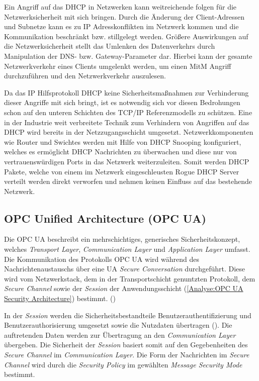 Ein Angriff auf das \ac{DHCP} in Netzwerken kann weitreichende folgen für die Netzwerksicherheit mit sich bringen. Durch die Änderung der Client-Adressen und Subnetze kann es zu \ac{IP} Adresskonflikten im Netzwerk kommen und die Kommunikation beschränkt bzw. stillgelegt werden. Größere Auswirkungen auf die Netzwerksicherheit stellt das Umlenken des Datenverkehrs durch Manipulation der \ac{DNS}- bzw. Gateway-Parameter dar. Hierbei kann der gesamte Netzwerkverkehr eines Clients umgelenkt werden, um einen \ac{MitM} Angriff durchzuführen und den Netzwerkverkehr auszulesen.

Da das \ac{IP} Hilfsprotokoll \ac{DHCP} keine Sicherheitsmaßnahmen zur Verhinderung dieser Angriffe mit sich bringt, ist es notwendig sich vor diesen Bedrohungen schon auf den unteren Schichten des \ac{TCP}/\ac{IP} Referenzmodells zu schützen. Eine in der Industrie weit verbreitete Technik zum Verhindern von Angriffen auf das \ac{DHCP} wird bereits in der Netzzugangsschicht umgesetzt. Netzwerkkomponenten wie Router und Swichtes werden mit Hilfe von \ac{DHCP} Snooping konfiguriert, welches es ermöglicht \ac{DHCP} Nachrichten zu überwachen und diese nur von vertrauenswürdigen Ports in das Netzwerk weiterzuleiten. Somit werden \ac{DHCP} Pakete, welche von einem im Netzwerk eingeschleusten Rogue \ac{DHCP} Server verteilt werden direkt verworfen und nehmen keinen Einfluss auf das bestehende Netzwerk.

\subsection{OPC Unified Architecture (OPC UA)}
\label{Analyse:OPC UA}
Die \ac{OPC UA} beschreibt ein mehrschichtiges, generisches Sicherheitskonzept, welches \textit{Transport Layer}, \textit{Communication Layer} und \textit{Application Layer} umfasst. Die Kommunikation des Protokolls \ac{OPC UA} wird während des Nachrichtenaustauschs über eine \ac{UA} \textit{Secure Conversation} durchgeführt. Diese wird vom Netzwerkstack, dem in der Transportschicht genuntzten Protokoll, dem \textit{Secure Channel} sowie der \textit{Session} der Anwendungsschicht (\autoref{Analyse:OPC UA Security Architecture}) bestimmt. (\cite{opcpt2})

In der \textit{Session} werden die Sicherheitsbestandteile Benutzerauthentifizierung und Benutzerauthorisierung umgesetzt sowie die Nutzdaten übertragen (\cite{opcpt2}). Die auftretenden Daten werden zur Übertragung an den \textit{Communication Layer} übergeben. Die Sicherheit der \textit{Session} basiert somit auf den Gegebenheiten des \textit{Secure Channel} im \textit{Communication Layer}. Die Form der Nachrichten im \textit{Secure Channel} wird durch die \textit{Security Policy} im gewählten \textit{Message Security Mode} bestimmt. 

